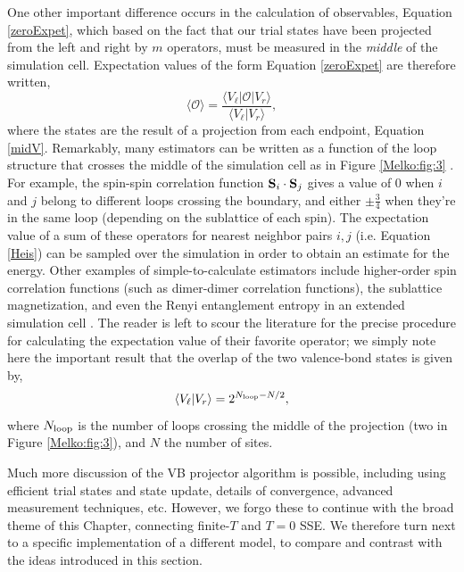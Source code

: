 \documentclass[vecphys]{svmult}
\begin{document}
One other important difference occurs in the calculation of observables, Equation \ref{zeroExpet}, which based on the fact that our trial states have been projected from the left and right by $m$ operators, must be measured in the {\em middle} of the simulation cell.
Expectation values of the form Equation \ref{zeroExpet} are therefore written,
\begin{equation}
\langle \mathcal{O} \rangle = \frac{\langle V_{\ell} | \mathcal{O} | V_r \rangle}{\langle V_{\ell} |   V_r \rangle},
\end{equation}
where the states are the result of a projection from each endpoint, Equation \ref{midV}.  
Remarkably, many estimators can be written as a function of the loop structure that crosses the middle of the simulation cell as in Figure \ref{Melko:fig:3} \cite{Melko:Beach06,Melko:AWSBeach,Melko:Sandvik10a}.
For example, the spin-spin correlation function ${\bf S}_i \cdot {\bf S}_j$ gives a value of 0 when $i$ and $j$ belong to different loops crossing the boundary, and either $ \pm \frac{3}{4}$ when they're in the same loop (depending on the sublattice of each spin).
The expectation value of a sum of these operators for nearest neighbor pairs $i,j$ (i.e. Equation \ref{Heis}) can be sampled over the simulation in order to obtain an estimate for the energy.
Other examples of simple-to-calculate estimators include higher-order spin correlation functions (such as dimer-dimer correlation functions), the sublattice magnetization, and even the Renyi entanglement entropy in an extended simulation cell \cite{Melko:Hastings10}.  The reader is left to scour the literature for the precise procedure for calculating the expectation value of their favorite operator; we simply note here the important result that 
the overlap of the two valence-bond states is given by,
\begin{equation}
\langle V_{\ell} |   V_r \rangle = 2^{N_{\rm loop} - N/2},
\end{equation}
where $N_{\rm loop}$ is the number of loops crossing the middle of the projection (two in Figure \ref{Melko:fig:3}), and $N$ the number of sites. 

Much more discussion of the VB projector algorithm is possible, including using efficient trial states and state update, details of convergence, advanced measurement techniques, etc. However, we forgo these to continue with the broad theme of this Chapter, connecting finite-$T$ and $T=0$ SSE.  We therefore turn next to a specific implementation of a different model, to compare and contrast with the ideas introduced in this section.
\end{document}
